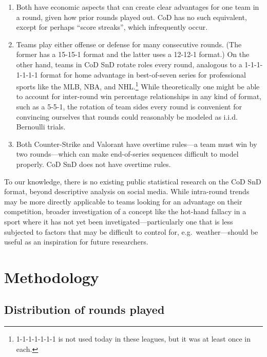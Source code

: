 \documentclass{article}
\providecommand{\tightlist}{%
  \setlength{\itemsep}{0pt}\setlength{\parskip}{0pt}}
\begin{document}
\begin{enumerate}
\def\labelenumi{\arabic{enumi}.}
\tightlist
\item
  Both have economic aspects that can create clear advantages for one
  team in a round, given how prior rounds played out. CoD has no such
  equivalent, except for perhaps ``score streaks'', which infrequently
  occur.
\item
  Teams play either offense or defense for many consecutive rounds. (The
  former has a 15-15-1 format and the latter uses a 12-12-1 format.) On
  the other hand, teams in CoD SnD rotate roles every round, analogous
  to a 1-1-1-1-1-1-1 format for home advantage in best-of-seven series
  for professional sports like the MLB, NBA, and NHL.\footnote{1-1-1-1-1-1-1
    is not used today in these leagues, but it was at least once in
    each.} While theoretically one might be able to account for
  inter-round win percentage relationships in any kind of format, such
  as a 5-5-1, the rotation of team sides every round is convenient for
  convincing ourselves that rounds could reasonably be modeled as i.i.d.
  Bernoulli trials.
\item
  Both Counter-Strike and Valorant have overtime rules---a team must win
  by two rounds---which can make end-of-series sequences difficult to
  model properly. CoD SnD does not have overtime rules.
\end{enumerate}

To our knowledge, there is no existing public statistical research on
the CoD SnD format, beyond descriptive analysis on social media. While
intra-round trends may be more directly applicable to teams looking for
an advantage on their competition, broader investigation of a concept
like the hot-hand fallacy in a sport where it has not yet been
invetigated---particularly one that is less subjected to factors that
may be difficult to control for, e.g.~weather---should be useful as an
inspiration for future researchers.

\hypertarget{methodology}{%
\section{Methodology}\label{methodology}}

\hypertarget{distribution-of-rounds-played}{%
\subsection{Distribution of rounds
played}\label{distribution-of-rounds-played}}
\end{document}
